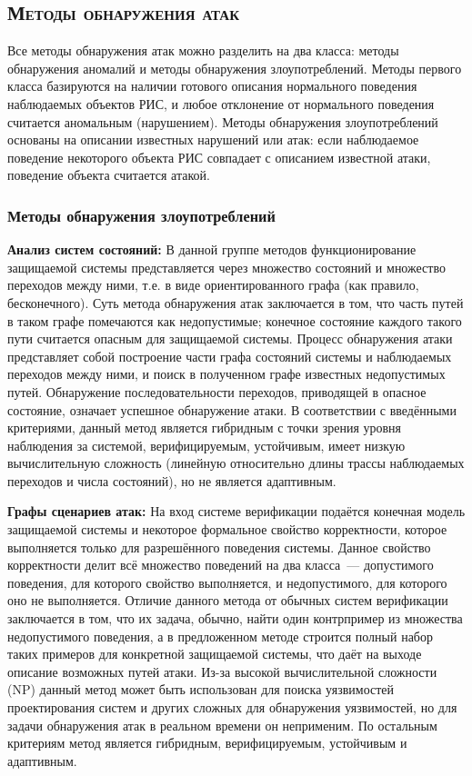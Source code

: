 \subsection{\textsc{Методы обнаружения атак}}

Все методы обнаружения атак можно разделить на два класса: методы обнаружения аномалий и методы обнаружения злоупотреблений. Методы первого класса базируются на наличии готового описания нормального поведения наблюдаемых объектов РИС, и любое отклонение от нормального поведения считается аномальным (нарушением). Методы обнаружения злоупотреблений основаны на описании известных нарушений или атак: если наблюдаемое поведение некоторого объекта РИС совпадает с описанием известной атаки, поведение объекта считается атакой.

\subsubsection{Методы обнаружения злоупотреблений}

\textbf{Анализ систем состояний:} В данной группе методов функционирование защищаемой системы представляется через множество состояний и множество переходов между ними, т.е. в виде ориентированного графа (как правило, бесконечного). Суть метода обнаружения атак заключается в том, что часть путей в таком графе помечаются как недопустимые; конечное состояние каждого такого пути считается опасным для защищаемой системы. Процесс обнаружения атаки представляет собой построение части графа состояний системы и наблюдаемых переходов между ними, и поиск в полученном графе известных недопустимых путей. Обнаружение последовательности переходов, приводящей в опасное состояние, означает успешное обнаружение атаки. В соответствии с введёнными критериями, данный метод является гибридным с точки зрения уровня наблюдения за системой, верифицируемым, устойчивым, имеет низкую вычислительную сложность (линейную относительно длины трассы наблюдаемых переходов и числа состояний), но не является адаптивным.

\textbf{Графы сценариев атак:} На вход системе верификации подаётся конечная модель защищаемой системы и некоторое формальное свойство корректности, которое выполняется только для разрешённого поведения системы. Данное свойство корректности делит всё множество поведений на два класса~--- допустимого поведения, для которого свойство выполняется, и недопустимого, для которого оно не выполняется. Отличие данного метода от обычных систем верификации заключается в том, что их задача, обычно, найти один контрпример из множества недопустимого поведения, а в предложенном методе строится полный набор таких примеров для конкретной защищаемой системы, что даёт на выходе описание возможных путей атаки. Из-за высокой вычислительной сложности (NP) данный метод может быть использован для поиска уязвимостей проектирования систем и других сложных для обнаружения уязвимостей, но для задачи обнаружения атак в реальном времени он неприменим. По остальным критериям метод является гибридным, верифицируемым, устойчивым и адаптивным.

